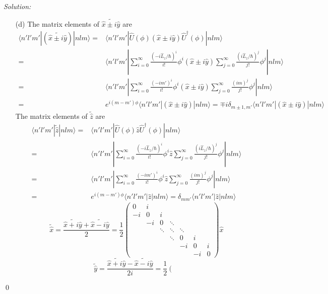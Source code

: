 \documentclass[10pt,a4paper]{article}
\newenvironment{sol}
    {\emph{Solution:}
    }
    {
    \qed
    }
\begin{document}
\begin{sol}
\begin{itemize}
\item[(d)] The matrix elements of $\widetilde{\hat{x}\pm i\hat{y}}$ are
\begin{align}
\nonumber\langle n'l'm'|(\widetilde{\hat{x}\pm i\hat{y}})|nlm\rangle=&\langle n'l'm'|\hat{U}(\phi)(\hat{x}\pm i\hat{y})\hat{U}^{\dagger}(\phi)|nlm\rangle\\
\nonumber=&\langle n'l'm'|\sum_{i=0}^{\infty}\frac{(-i\hat{L}_z/\hbar)^i}{i!}\phi^i(\hat{x}\pm i\hat{y})\sum_{j=0}^{\infty}\frac{(i\hat{L}_z/\hbar)^j}{j!}\phi^j|nlm\rangle\\
\nonumber=&\langle n'l'm'|\sum_{i=0}^{\infty}\frac{(-im')^i}{i!}\phi^i(\hat{x}\pm i\hat{y})\sum_{j=0}^{\infty}\frac{(im)^j}{j!}\phi^j|nlm\rangle\\
=&e^{i(m-m')\phi}\langle n'l'm'|(\hat{x}\pm i\hat{y})|nlm\rangle=\mp i\delta_{m\pm1,m'}\langle n'l'm'|(\hat{x}\pm i\hat{y})|nlm\rangle
\end{align}
The matrix elements of $\tilde{\hat{z}}$ are
\begin{align}
\nonumber\langle n'l'm'|\tilde{\hat{z}}|nlm\rangle=&\langle n'l'm'|\hat{U}(\phi)\hat{z}\hat{U}^{\dagger}(\phi)|nlm\rangle\\
\nonumber=&\langle n'l'm'|\sum_{i=0}^{\infty}\frac{(-i\hat{L}_z/\hbar)^i}{i!}\phi^i\hat{z}\sum_{j=0}^{\infty}\frac{(i\hat{L}_z/\hbar)^j}{j!}\phi^j|nlm\rangle\\
\nonumber=&\langle n'l'm'|\sum_{i=0}^{\infty}\frac{(-im')^i}{i!}\phi^i\hat{z}\sum_{j=0}^{\infty}\frac{(im)^j}{j!}\phi^j|nlm\rangle\\
=&e^{i(m-m')\phi}\langle n'l'm'|\hat{z}|nlm\rangle=\delta_{mm'}\langle n'l'm'|\hat{z}|nlm\rangle
\end{align}
\begin{equation}
\tilde{\hat{x}}=\frac{\widetilde{\hat{x}+i\hat{y}}+\widetilde{\hat{x}-i\hat{y}}}{2}=\frac{1}{2}\left(\begin{array}{ccccccc}
0&i&&&&&\\
-i&0&i&&&&\\
&-i&0&\ddots&&&\\
&&\ddots&\ddots&\ddots&&\\
&&&\ddots&0&i&\\
&&&&-i&0&i\\
&&&&&-i&0
\end{array}\right)\hat{x}
\end{equation}
\begin{equation}
\tilde{\hat{y}}=\frac{\widetilde{\hat{x}+i\hat{y}}-\widetilde{\hat{x}-i\hat{y}}}{2i}=\frac{1}{2}\left(\begin{array}{ccccccc}

\end{array}
\end{equation}
\end{itemize}
\end{sol}
\end{document}
